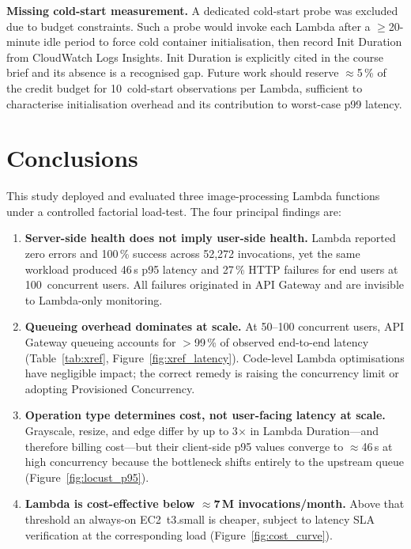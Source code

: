 \documentclass[10pt,twocolumn]{article}
\begin{document}
\textbf{Missing cold-start measurement.}
A dedicated cold-start probe was excluded due to budget constraints. Such a
probe would invoke each Lambda after a $\geq$20-minute idle period to force
cold container initialisation, then record Init Duration from CloudWatch Logs
Insights. Init Duration
is explicitly cited in the course brief and its absence is a recognised gap.
Future work should reserve $\approx$5\,\% of the credit budget for 10~cold-start
observations per Lambda, sufficient to characterise initialisation overhead and
its contribution to worst-case p99 latency.

\section{Conclusions}
\label{sec:conclusions}

This study deployed and evaluated three image-processing Lambda functions under
a controlled factorial load-test. The four principal findings are:

\begin{enumerate}
  \item \textbf{Server-side health does not imply user-side health.}
        Lambda reported zero errors and 100\,\% success across 52{,}272
        invocations, yet the same workload produced 46\,s p95 latency and
        27\,\% HTTP failures for end users at 100~concurrent users. All failures
        originated in API Gateway and are invisible to Lambda-only monitoring.
  \item \textbf{Queueing overhead dominates at scale.}
        At 50--100 concurrent users, API Gateway queueing accounts for
        $>$99\,\% of observed end-to-end latency (Table~\ref{tab:xref},
        Figure~\ref{fig:xref_latency}). Code-level Lambda optimisations have
        negligible impact; the correct remedy is raising the concurrency limit
        or adopting Provisioned Concurrency.
  \item \textbf{Operation type determines cost, not user-facing latency at scale.}
        Grayscale, resize, and edge differ by up to 3$\times$ in Lambda
        Duration---and therefore billing cost---but their client-side p95 values
        converge to $\approx$46\,s at high concurrency because the bottleneck
        shifts entirely to the upstream queue (Figure~\ref{fig:locust_p95}).
  \item \textbf{Lambda is cost-effective below $\approx$7\,M invocations/month.}
        Above that threshold an always-on EC2~t3.small is cheaper, subject to
        latency SLA verification at the corresponding load
        (Figure~\ref{fig:cost_curve}).
\end{enumerate}
\end{document}
